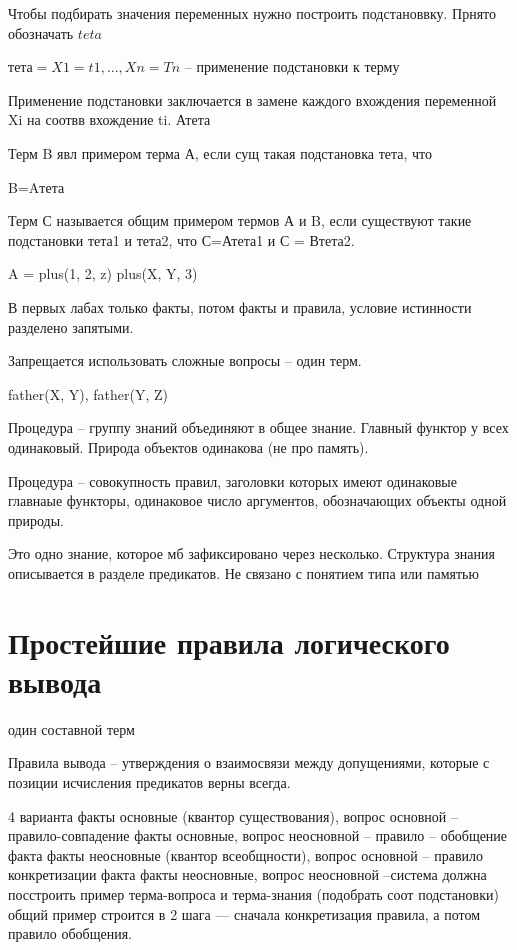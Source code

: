 \documentclass[12pt]{report}
\begin{document}
Чтобы подбирать значения переменных нужно построить подстановвку. Прнято обозначать $teta$


$тета = {X1=t1, ..., Xn=Tn}$ -- применение подстановки к терму


Применение подстановки заключается в замене каждого вхождения переменной Xi на соотвв вхождение ti. Атета

Терм B явл примером терма А, если сущ такая подстановка тета, что 

B=Aтета


Терм С называется общим примером термов А и B, если существуют такие подстановки тета1 и тета2, что С=Атета1 и С = Втета2.


A = plus(1, 2, z)
plus(X, Y, 3)


В первых лабах только факты, потом факты и правила, условие истинности разделено запятыми.

Запрещается использовать сложные вопросы -- один терм.

father(X, Y), father(Y, Z)


Процедура -- группу знаний объединяют в общее знание. Главный функтор у всех одинаковый. Природа объектов одинакова (не про память).

Процедура -- совокупность правил, заголовки которых имеют одинаковые главнаые функторы, одинаковое число аргументов, обозначающих объекты одной природы. 

Это одно знание, которое мб зафиксировано через несколько. Структура знания описывается в разделе предикатов. Не связано с понятием типа или памятью



\section{Простейшие правила логического вывода}

один составной терм

Правила вывода -- утверждения о взаимосвязи между допущениями, которые с позиции исчисления предикатов верны всегда.

4 варианта
факты основные (квантор существования), вопрос основной -- правило-совпадение
факты основные, вопрос неосновной -- правило -- обобщение факта
факты неосновные (квантор всеобщности), вопрос основной -- правило конкретизации факта
факты неосновные, вопрос неосновной --система должна посстроить пример терма-вопроса и терма-знания (подобрать соот подстановки) общий пример строится в 2 шага --- сначала конкретизация правила, а потом правило обобщения.
\end{document}
